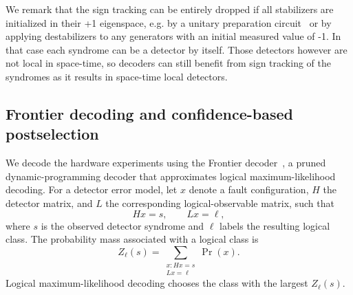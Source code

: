 
We remark that the sign tracking can be entirely dropped if all stabilizers are initialized in their +1 eigenspace, e.g. by a unitary preparation circuit~\cite{forlivesi2025} or by applying destabilizers to any generators with an initial measured value of -1. In that case each syndrome can be a detector by itself. Those detectors however are not local in space-time, so decoders can still benefit from sign tracking of the syndromes as it results in space-time local detectors.



\subsection{Frontier decoding and confidence-based postselection}
\label{apx:decoder}

We decode the hardware experiments using the Frontier decoder~\cite{leverrier2026}, a pruned dynamic-programming decoder that approximates logical maximum-likelihood decoding. For a detector error model, let $x$ denote a fault configuration, $H$ the detector matrix, and $L$ the corresponding logical-observable matrix, such that
\begin{equation}
    Hx=s, \qquad Lx=\ell,
\end{equation}
where $s$ is the observed detector syndrome and $\ell$ labels the resulting logical class. The probability mass associated with a logical class is
\begin{equation}
    Z_\ell(s)
    =
    \sum_{\substack{x:Hx=s\\Lx=\ell}}
    \Pr(x).
\end{equation}
Logical maximum-likelihood decoding chooses the class with the largest $Z_\ell(s)$.

